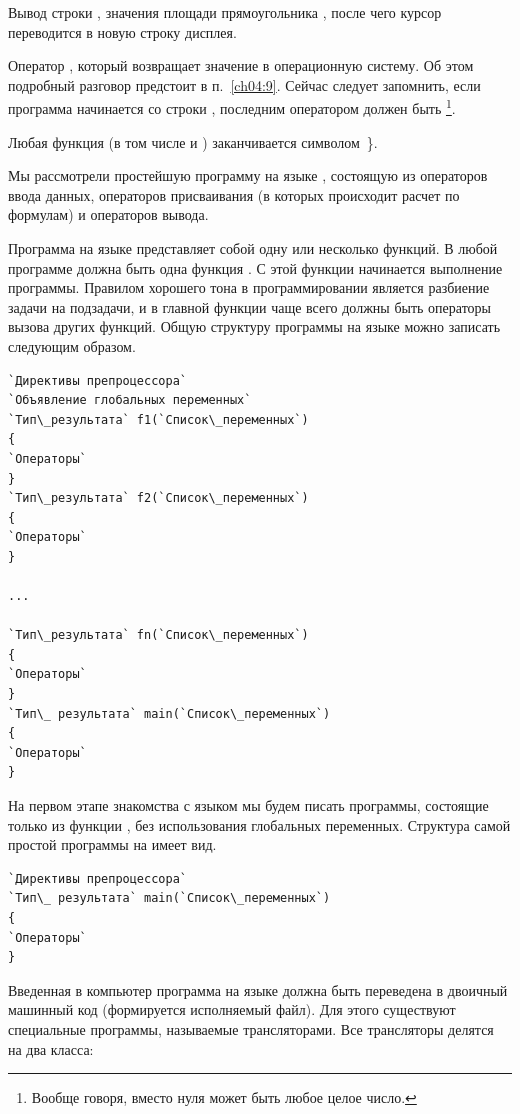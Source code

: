  Вывод строки , значения площади
прямоугольника , после чего курсор переводится в новую строку дисплея.

 Оператор , который возвращает значение в
операционную систему. Об этом подробный разговор предстоит в п.~\ref{ch04:9}.%
Сейчас следует запомнить, если программа
начинается со строки , последним оператором должен быть
\footnote{Вообще говоря, вместо нуля может быть любое целое число.}.

 Любая функция (в том числе и ) заканчивается символом~\}.

Мы рассмотрели простейшую программу на языке , состоящую из операторов ввода 
данных, операторов присваивания (в
которых происходит расчет по формулам) и операторов вывода. 

Программа на языке  представляет собой одну или несколько функций. 
В любой программе 
должна быть одна функция . С этой функции начинается 
выполнение программы. Правилом хорошего
тона в программировании является разбиение задачи на подзадачи, и в главной функции 
чаще всего должны быть операторы
вызова других функций. Общую структуру программы на 
языке  можно записать следующим
образом. 

\begin{lstlisting}
`Директивы препроцессора`
`Объявление глобальных переменных`
`Тип\_результата` f1(`Список\_переменных`)
{
`Операторы`
}
`Тип\_результата` f2(`Список\_переменных`)
{
`Операторы`
}

...

`Тип\_результата` fn(`Список\_переменных`)
{
`Операторы`
}
`Тип\_ результата` main(`Список\_переменных`)
{
`Операторы`
}
\end{lstlisting}

На первом этапе знакомства с языком мы будем писать программы, состоящие только из функции , без использования
глобальных переменных. Структура самой  простой программы на  имеет вид.
\begin{lstlisting}
`Директивы препроцессора`
`Тип\_ результата` main(`Список\_переменных`)
{
`Операторы`
}
\end{lstlisting}

Введенная в компьютер программа на языке  должна быть переведена в двоичный машинный код (формируется
исполняемый файл). Для этого существуют специальные программы, называемые трансляторами. Все
трансляторы  делятся на два класса:


